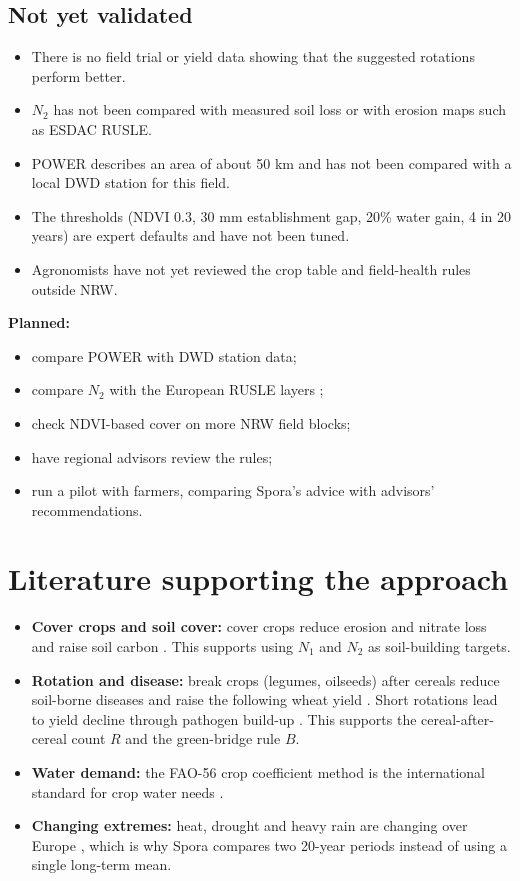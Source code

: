 \documentclass[11pt,a4paper]{article}
\begin{document}
\subsection*{Not yet validated}
\begin{itemize}
\item There is no field trial or yield data showing that the suggested rotations perform better.
\item $N_2$ has not been compared with measured soil loss or with erosion maps such as ESDAC RUSLE.
\item POWER describes an area of about 50 km and has not been compared with a local DWD station for this field.
\item The thresholds (NDVI 0.3, 30 mm establishment gap, 20\% water gain, 4 in 20 years) are expert defaults and have not been tuned.
\item Agronomists have not yet reviewed the crop table and field-health rules outside NRW.
\end{itemize}
\textbf{Planned:}
\begin{itemize}
\item compare POWER with DWD station data;
\item compare $N_2$ with the European RUSLE layers \cite{panagos2015};
\item check NDVI-based cover on more NRW field blocks;
\item have regional advisors review the rules;
\item run a pilot with farmers, comparing Spora's advice with advisors' recommendations.
\end{itemize}

\section{Literature supporting the approach}
\begin{itemize}
\item \textbf{Cover crops and soil cover:} cover crops reduce erosion and nitrate loss and raise soil carbon \cite{tonitto2006,poeplau2015}. This supports using $N_1$ and $N_2$ as soil-building targets.
\item \textbf{Rotation and disease:} break crops (legumes, oilseeds) after cereals reduce soil-borne diseases and raise the following wheat yield \cite{kirkegaard2008,angus2015}. Short rotations lead to yield decline through pathogen build-up \cite{bennett2012}. This supports the cereal-after-cereal count $R$ and the green-bridge rule $B$.
\item \textbf{Water demand:} the FAO-56 crop coefficient method is the international standard for crop water needs \cite{fao56}.
\item \textbf{Changing extremes:} heat, drought and heavy rain are changing over Europe \cite{ipcc2021}, which is why Spora compares two 20-year periods instead of using a single long-term mean.
\end{itemize}
\end{document}
